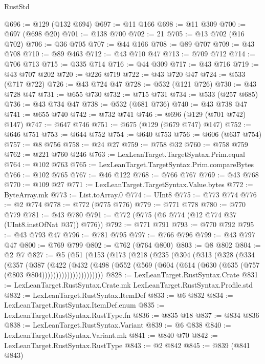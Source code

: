 \begin{lexlean}{RustStd}
\begin{coremodule}
@696 := @129 (@132 @694)
@697 := @11 @166
@698 := @11 @309
@700 := @697 (@698 @20)
@701 := @138 @700
@702 := 21
@705 := @13 @702 (@16 @702)
@706 := @36 @705
@707 := @44 @166
@708 := @89 @707
@709 := @43 @708
@710 := @89 @463
@712 := @43 @710 @47
@713 := @709 @712
@714 := @706 @713
@715 := @335 @714
@716 := @44 @309
@717 := @43 @716
@719 := @43 @707 @202
@720 := @226 @719
@722 := @43 @720 @47
@724 := @533 (@717 @722)
@726 := @43 @724 @47
@728 := @532 (@121 @726)
@730 := @43 @728 @47
@731 := @655 @730
@732 := @715 @731
@734 := @533 (@257 @685)
@736 := @43 @734 @47
@738 := @532 (@681 @736)
@740 := @43 @738 @47
@741 := @655 @740
@742 := @732 @741
@746 := @696 (@129 (@701 @742) @147)
@747 := @647 @746
@751 := @675 (@129 (@679 @747) @147)
@752 := @646 @751
@753 := @644 @752
@754 := @640 @753
@756 := @606 (@637 @754)
@757 := @8 @756
@758 := @24 @27
@759 := @758 @32
@760 := @758 @759
@762 := @221 @760 @246
@763 := LexLeanTarget.TargetSyntax.Prim.equal
@764 := @102 @763
@765 := LexLeanTarget.TargetSyntax.Prim.compareBytes
@766 := @102 @765
@767 := @46 @122
@768 := @766 @767
@769 := @43 @768
@770 := @109 @27
@771 := LexLeanTarget.TargetSyntax.Value.bytes
@772 := ByteArray.mk
@773 := List.toArray.{0}
@774 := UInt8
@775 := @773 @774
@776 := @2 @774
@778 := @772 (@775 @776)
@779 := @771 @778
@780 := @770 @779
@781 := @43 @780
@791 := @772 (@775 (@6 @774 (@12 @774 @37 (UInt8.instOfNat @37)) @776))
@792 := @771 @791
@793 := @770 @792
@795 := @43 @793 @47
@796 := @781 @795
@797 := @766 @796
@799 := @43 @797 @47
@800 := @769 @799
@802 := @762 (@764 @800)
@803 := @8 @802
@804 := @2 @7
@827 := @5
    (@51
      (@153
        (@173
          (@218
            (@235
              (@304
                (@313
                  (@328
                    (@334
                      (@357
                        (@387
                          (@422
                            (@432
                              (@498
                                (@552
                                  (@569
                                    (@604 (@614 (@630 (@635 (@757 (@803 @804))))))))))))))))))))))
@828 := LexLeanTarget.RustSyntax.Crate
@831 := LexLeanTarget.RustSyntax.Crate.mk LexLeanTarget.RustSyntax.Profile.std
@832 := LexLeanTarget.RustSyntax.ItemDef
@833 := @6 @832
@834 := LexLeanTarget.RustSyntax.ItemDef.enum
@835 := LexLeanTarget.RustSyntax.RustType.fn
@836 := @835 @18
@837 := @834 @836
@838 := LexLeanTarget.RustSyntax.Variant
@839 := @6 @838
@840 := LexLeanTarget.RustSyntax.Variant.mk
@841 := @840 @70
@842 := LexLeanTarget.RustSyntax.RustType
@843 := @2 @842
@845 := @839 (@841 @843)

\end{coremodule}
\end{lexlean}
